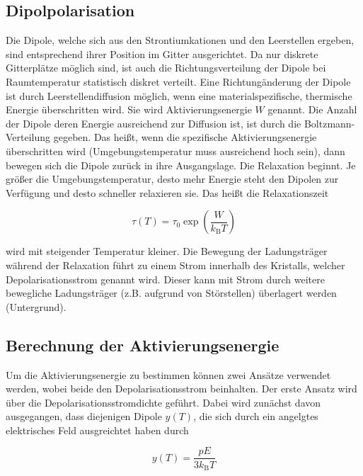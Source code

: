 \subsection{Dipolpolarisation}
\label{sec:Dipolpolarisation}

Die Dipole, welche sich aus den Strontiumkationen und den Leerstellen ergeben, 
sind entsprechend ihrer Position im Gitter ausgerichtet. Da nur diskrete 
Gitterplätze möglich sind, ist auch die Richtungsverteilung der Dipole bei 
Raumtemperatur statistisch diskret verteilt. Eine Richtungänderung der 
Dipole ist durch Leerstellendiffusion möglich, wenn eine materialspezifische, 
thermische Energie überschritten wird. Sie wird Aktivierungsenergie $W$ genannt. 
Die Anzahl der Dipole deren Energie ausreichend zur Diffusion ist, ist durch die 
Boltzmann-Verteilung gegeben. Das heißt, wenn die spezifische Aktivierungsenergie 
überschritten wird  (Umgebungstemperatur muss ausreichend hoch sein), dann bewegen sich 
die Dipole zurück in ihre Ausgangslage. Die Relaxation beginnt. 
Je größer die Umgebungstemperatur, desto mehr Energie steht den Dipolen zur Verfügung 
und desto schneller relaxieren sie. Das heißt die Relaxationszeit 

\begin{equation}
    \tau(T) = \tau_0 \exp{\left(\frac{W}{k_\text{B}T}\right)}
    \label{eq1}
\end{equation}

wird mit steigender Temperatur kleiner. Die Bewegung der Ladungsträger während der 
Relaxation führt zu einem Strom innerhalb des Kristalls, welcher 
Depolarisationsstrom genannt wird. Dieser kann mit Strom durch
weitere bewegliche Ladungsträger (z.B. aufgrund von Störstellen) überlagert werden
(Untergrund).


\subsection{Berechnung der Aktivierungsenergie}
\label{sec:Aktivierungsenergie}

Um die Aktivierungsenergie zu bestimmen können zwei Ansätze verwendet werden,
wobei beide den Depolarisationsstrom beinhalten.
Der erste Ansatz wird über die Depolarisationsstromdichte
geführt. Dabei wird zunächst davon ausgegangen, dass diejenigen Dipole $y(T)$, die 
sich durch ein angelgtes elektrisches Feld ausgreichtet haben durch 

\begin{equation*}
    y(T) = \frac{p E}{3 k_{\text{B}} T} 
\end{equation*}


